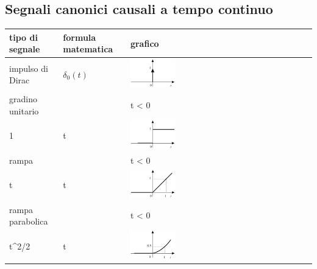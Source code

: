 \documentclass[a4paper]{article}
\begin{document}
\subsection{Segnali canonici causali a tempo continuo}
\begin{center}
	\begin{tabularx}{\textwidth}{l | l | X}
		\textbf{tipo di segnale} & \textbf{formula matematica} & \textbf{grafico} \\
		\toprule
		impulso di Dirac & \(\delta_0(t)\) & \includegraphics[width=0.25\textwidth]{dirac1.png} \\
		\midrule
		gradino unitario & \(\delta_{-1}(t) = \begin{cases} 0 & t < 0 \\ 1 & t \geq 0 \end{cases}\) & \includegraphics[width=0.25\textwidth]{gradino.png} \\
		\midrule
		rampa & \(\delta_{-2}(t) = \begin{cases} 0 & t < 0 \\ t & t \geq 0 \end{cases}\) & \includegraphics[width=0.25\textwidth]{rampa.png} \\
		\midrule
		rampa parabolica & \(\delta_{-3}(t) = \begin{cases} 0 & t < 0 \\ t^2/2 & t \geq 0 \end{cases}\) & \includegraphics[width=0.25\textwidth]{rampa parabolica.png} \\
	\end{tabularx}
\end{center}
\end{document}
